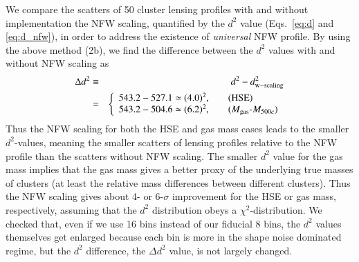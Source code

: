 \documentclass[iop, apj]{emulateapj}
\newcommand{\?}{\stackrel{?}{=}}
\begin{document}
%
We compare the scatters of 50 cluster lensing profiles with and without
implementation the NFW scaling, quantified by the $d^2$ value
(Eqs.~\ref{eq:d} and \ref{eq:d_nfw}), in order to address the existence
of {\it universal} NFW profile.  By using the above method (2b), we find
the difference between the $d^2$ values with and without NFW scaling as
%
\begin{eqnarray}
 \Delta d^2&\equiv& d^2-d^2_{\rm w-scaling}\nonumber\\
 &=&
  \left\{
\begin{array}{ll}
 543.2-527.1\simeq (4.0)^2, & \hspace{1em}\mbox{(HSE)}\\
 543.2-504.6\simeq (6.2)^2, & \hspace{1em}\mbox{($M_{\rm gas}$-$M_{500c}$)}
\end{array}
	 \right.
  \label{eq:dd2}
\end{eqnarray}
%
Thus the NFW scaling for both the HSE and gas mass cases leads to the
smaller $d^2$-values, meaning the smaller scatters of lensing profiles
relative to the NFW profile than the scatters without NFW scaling. The
smaller $d^2$ value for the gas mass implies that the gas mass gives a
better proxy of the underlying true masses of clusters (at least the
relative mass differences between different clusters).
Thus the NFW scaling gives about 4- or 6-$\sigma$ improvement for the
HSE or gas mass, respectively, assuming that the $d^2$ distribution
obeys a $\chi^2$-distribution.  We checked that, even if we use 16 bins
instead of our fiducial 8 bins, the $d^2$ values themselves get enlarged
because each bin is more in the shape noise dominated regime, but the
$d^2$ difference, the $\Delta d^2$ value, is not largely changed.
\end{document}
